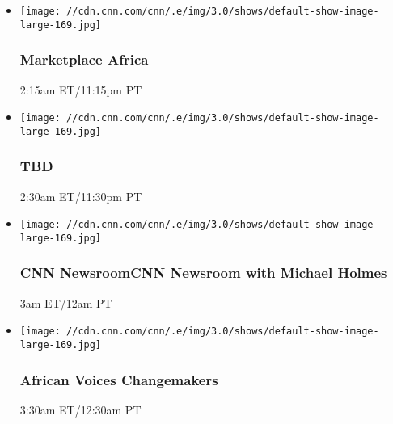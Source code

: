 \begin{itemize}
\item
  \texttt{[image: //cdn.cnn.com/cnn/.e/img/3.0/shows/default-show-image-large-169.jpg]}

  \hypertarget{marketplace-africa-3}{%
  \subsubsection{Marketplace Africa}\label{marketplace-africa-3}}

  2:15am ET/11:15pm PT
\end{itemize}

\begin{itemize}
\item
  \texttt{[image: //cdn.cnn.com/cnn/.e/img/3.0/shows/default-show-image-large-169.jpg]}

  \hypertarget{tbd-2}{%
  \subsubsection{TBD}\label{tbd-2}}

  2:30am ET/11:30pm PT
\end{itemize}

\begin{itemize}
\item
  \texttt{[image: //cdn.cnn.com/cnn/.e/img/3.0/shows/default-show-image-large-169.jpg]}

  \hypertarget{cnn-newsroomcnn-newsroom-with-michael-holmes--2}{%
  \subsubsection{CNN NewsroomCNN Newsroom with Michael Holmes
  }\label{cnn-newsroomcnn-newsroom-with-michael-holmes--2}}

  3am ET/12am PT
\end{itemize}

\begin{itemize}
\item
  \texttt{[image: //cdn.cnn.com/cnn/.e/img/3.0/shows/default-show-image-large-169.jpg]}

  \hypertarget{african-voices-changemakers-3}{%
  \subsubsection{African Voices
  Changemakers}\label{african-voices-changemakers-3}}

  3:30am ET/12:30am PT
\end{itemize}


